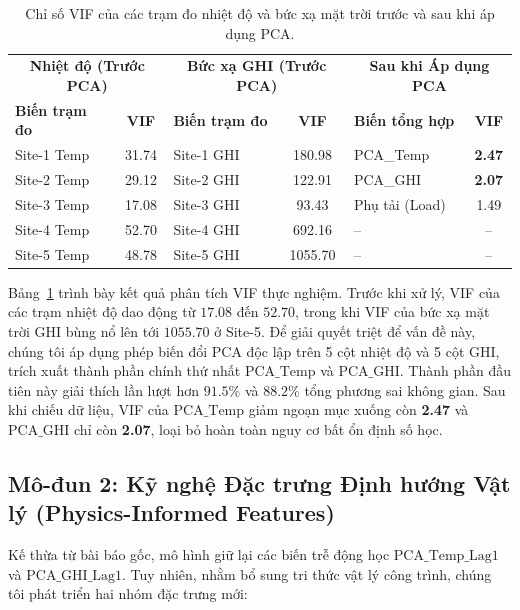 \begin{table}[htbp]
    \centering
    \caption{Chỉ số VIF của các trạm đo nhiệt độ và bức xạ mặt trời trước và sau khi áp dụng PCA.}
    \label{tab:vif_comparison}
    \begin{tabular}{lc|lc|lc}
        \toprule
        \multicolumn{2}{c|}{\textbf{Nhiệt độ (Trước PCA)}} & \multicolumn{2}{c|}{\textbf{Bức xạ GHI (Trước PCA)}} & \multicolumn{2}{c}{\textbf{Sau khi Áp dụng PCA}} \\
        \textbf{Biến trạm đo} & \textbf{VIF} & \textbf{Biến trạm đo} & \textbf{VIF} & \textbf{Biến tổng hợp} & \textbf{VIF} \\
        \midrule
        Site-1 Temp & 31.74 & Site-1 GHI & 180.98 & PCA\_Temp & \textbf{2.47} \\
        Site-2 Temp & 29.12 & Site-2 GHI & 122.91 & PCA\_GHI & \textbf{2.07} \\
        Site-3 Temp & 17.08 & Site-3 GHI & 93.43 & Phụ tải (Load) & 1.49 \\
        Site-4 Temp & 52.70 & Site-4 GHI & 692.16 & -- & -- \\
        Site-5 Temp & 48.78 & Site-5 GHI & 1055.70 & -- & -- \\
        \bottomrule
    \end{tabular}
\end{table}

Bảng~\ref{tab:vif_comparison} trình bày kết quả phân tích VIF thực nghiệm. Trước khi xử lý, VIF của các trạm nhiệt độ dao động từ $17.08$ đến $52.70$, trong khi VIF của bức xạ mặt trời GHI bùng nổ lên tới $1055.70$ ở Site-5. Để giải quyết triệt để vấn đề này, chúng tôi áp dụng phép biến đổi PCA độc lập trên 5 cột nhiệt độ và 5 cột GHI, trích xuất thành phần chính thứ nhất $\text{PCA\_Temp}$ và $\text{PCA\_GHI}$. Thành phần đầu tiên này giải thích lần lượt hơn $91.5\%$ và $88.2\%$ tổng phương sai không gian. Sau khi chiếu dữ liệu, VIF của $\text{PCA\_Temp}$ giảm ngoạn mục xuống còn \textbf{2.47} và $\text{PCA\_GHI}$ chỉ còn \textbf{2.07}, loại bỏ hoàn toàn nguy cơ bất ổn định số học.

\subsection{Mô-đun 2: Kỹ nghệ Đặc trưng Định hướng Vật lý (Physics-Informed Features)}
Kế thừa từ bài báo gốc, mô hình giữ lại các biến trễ động học $\text{PCA\_Temp\_Lag1}$ và $\text{PCA\_GHI\_Lag1}$. Tuy nhiên, nhằm bổ sung tri thức vật lý công trình, chúng tôi phát triển hai nhóm đặc trưng mới:

